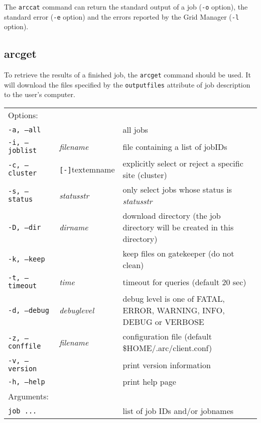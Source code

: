 The \texttt{arccat} command can return the standard output of a job
(\texttt{-o} option), the standard error (\texttt{-e} option) and the
errors reported by the Grid Manager (\texttt{-l} option).

\begin{framed}

\end{framed}


\subsection{arcget}
\label{sec:arcget}

To retrieve the results of a finished job, the \texttt{arcget}
 command should be used. It
will download the files specified by the \texttt{outputfiles}
attribute of job description to the user's computer.

\hspace*{0.5cm}
\begin{shaded}
\end{shaded}
\begin{longtable}{llp{8cm}}
   Options:&&\\
   \texttt{-a, --all}& & all jobs\\
   \texttt{-i, --joblist}& \textit{filename} & file containing a list of jobIDs\\
   \texttt{-c, --cluster}&\verb#[-]#textem{name}&explicitly select or reject a specific site (cluster)\\
   \texttt{-s, --status}& \textit{statusstr} &only select jobs whose status is \textit{statusstr}\\
   \texttt{-D, --dir} & \textit{dirname} & download directory (the job directory will be created in this directory)\\
   \texttt{-k, --keep}& & keep files on gatekeeper (do not clean)\\
   \texttt{-t, --timeout}& \textit{time} & timeout for queries (default 20 sec)\\
   \texttt{-d, --debug}& \textit{debuglevel}&debug level is one of  FATAL, ERROR, WARNING, INFO, DEBUG or VERBOSE\\
   \texttt{-z, --conffile}&\textit{filename}& configuration file (default {\$}HOME/.arc/client.conf)\\
   \texttt{-v, --version}& & print version information\\
   \texttt{-h, --help}& & print help page\\
   Arguments:&&\\
   \texttt{job ...} && list of job IDs and/or jobnames\\
\end{longtable}

